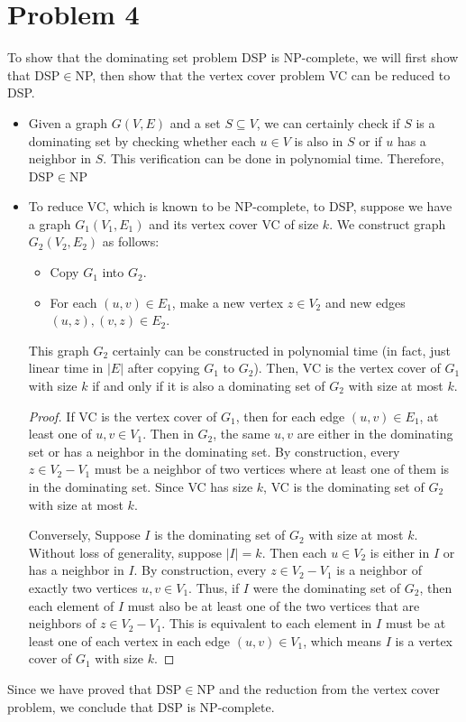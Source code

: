 \documentclass{article}
\begin{document}
\section*{Problem 4}
To show that the dominating set problem DSP is NP-complete, we will first show that DSP$\in$NP, then show that the vertex cover problem VC can be reduced to DSP.
\begin{itemize}
\item Given a graph $G(V,E)$ and a set $S\subseteq V$, we can certainly check if $S$ is a dominating set by checking whether each $u\in V$ is also in $S$ or if $u$ has a neighbor in $S$. This verification can be done in polynomial time. Therefore, DSP$\in$NP

\item To reduce VC, which is known to be NP-complete, to DSP, suppose we have a graph $G_1(V_1,E_1)$ and its vertex cover VC of size $k$. We construct graph $G_2(V_2,E_2)$ as follows:
	\begin{itemize}
	\item Copy $G_1$ into $G_2$.
	\item For each $(u,v)\in E_1$, make a new vertex $z\in V_2$ and new edges $(u,z), (v,z)\in E_2$.
	\end{itemize}
This graph $G_2$ certainly can be constructed in polynomial time (in fact, just linear time in $|E|$ after copying $G_1$ to $G_2$). Then, VC is the vertex cover of $G_1$ with size $k$ if and only if it is also a dominating set of $G_2$ with size at most $k$.
\begin{proof}
If VC is the vertex cover of $G_1$, then for each edge $(u,v)\in E_1$, at least one of $u,v\in V_1$. Then in $G_2$, the same $u,v$ are either in the dominating set or has a neighbor in the dominating set. By construction, every $z\in V_2-V_1$ must be a neighbor of two vertices where at least one of them is in the dominating set. Since VC has size $k$, VC is the dominating set of $G_2$ with size at most $k$.

Conversely, Suppose $I$ is the dominating set of $G_2$ with size at most $k$. Without loss of generality, suppose $|I|=k$. Then each $u\in V_2$ is either in $I$ or has a neighbor in $I$. By construction, every $z\in V_2-V_1$ is a neighbor of exactly two vertices $u,v\in V_1$. Thus, if $I$ were the dominating set of $G_2$, then each element of $I$ must also be at least one of the two vertices that are neighbors of $z\in V_2-V_1$. This is equivalent to each element in $I$ must be at least one of each vertex in each edge $(u,v)\in V_1$, which means $I$ is a vertex cover of $G_1$ with size $k$.
\end{proof}
\end{itemize}
Since we have proved that DSP$\in$NP and the reduction from the vertex cover problem, we conclude that DSP is NP-complete.
\end{document}
